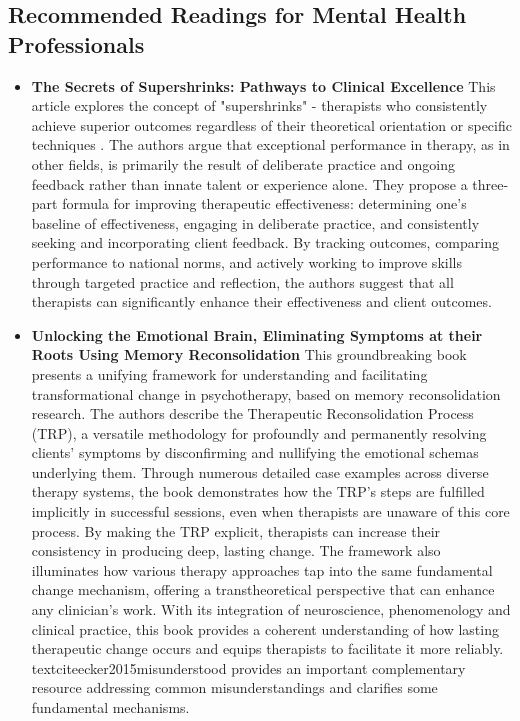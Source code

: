 \documentclass[12pt,letterpaper]{book}
\begin{document}
\subsection{Recommended Readings for Mental Health Professionals}
\label{sec:professionalReadings}
\begin{itemize}
	\item \textbf{The Secrets of Supershrinks: Pathways to Clinical Excellence} This article explores the concept of "supershrinks" - therapists who consistently achieve superior outcomes regardless of their theoretical orientation or specific techniques \cite{miller2014secrets}. The authors argue that exceptional performance in therapy, as in other fields, is primarily the result of deliberate practice and ongoing feedback rather than innate talent or experience alone. They propose a three-part formula for improving therapeutic effectiveness: determining one's baseline of effectiveness, engaging in deliberate practice, and consistently seeking and incorporating client feedback. By tracking outcomes, comparing performance to national norms, and actively working to improve skills through targeted practice and reflection, the authors suggest that all therapists can significantly enhance their effectiveness and client outcomes.
	\item \textbf{Unlocking the Emotional Brain, Eliminating Symptoms at their Roots Using Memory Reconsolidation} This groundbreaking book presents a unifying framework for understanding and facilitating transformational change in psychotherapy, based on memory reconsolidation research. The authors describe the Therapeutic Reconsolidation Process (TRP), a versatile methodology for profoundly and permanently resolving clients' symptoms by disconfirming and nullifying the emotional schemas underlying them. Through numerous detailed case examples across diverse therapy systems, the book demonstrates how the TRP's steps are fulfilled implicitly in successful sessions, even when therapists are unaware of this core process. By making the TRP explicit, therapists can increase their consistency in producing deep, lasting change. The framework also illuminates how various therapy approaches tap into the same fundamental change mechanism, offering a transtheoretical perspective that can enhance any clinician's work. With its integration of neuroscience, phenomenology and clinical practice, this book provides a coherent understanding of how lasting therapeutic change occurs and equips therapists to facilitate it more reliably. textcite{ecker2015misunderstood} provides an important complementary resource addressing common misunderstandings and clarifies some fundamental mechanisms.
\end{itemize}
\end{document}

